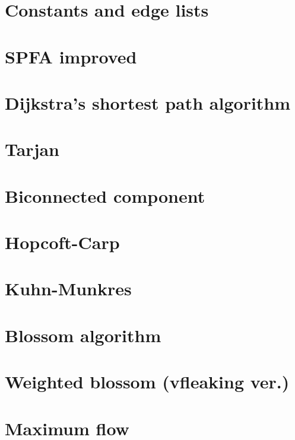 \documentclass[UTF8,a4paper]{report}
\begin{document}
		\section{Constants and edge lists}
			
		\section{SPFA improved}
			
		\section{Dijkstra's shortest path algorithm}
			
		\section{Tarjan}
			
		\section{Biconnected component}
			
		\section{Hopcoft-Carp}
			
		\section{Kuhn-Munkres}
			
		\section{Blossom algorithm}
			
		\section{Weighted blossom (vfleaking ver.)}	
			
		\section{Maximum flow}
			
\end{document}
